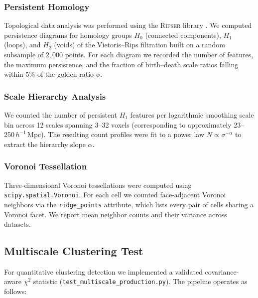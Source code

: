 \documentclass[12pt,a4paper]{article}
\begin{document}
\subsubsection{Persistent Homology}

Topological data analysis was performed using the \textsc{Ripser} library
\citep{bauer2021ripser}.  We computed persistence diagrams for homology groups
$H_0$ (connected components), $H_1$ (loops), and $H_2$ (voids) of the
Vietoris--Rips filtration built on a random subsample of $2{,}000$ points.
For each diagram we recorded the number of features, the maximum persistence,
and the fraction of birth--death scale ratios falling within 5\% of the golden
ratio $\phi$.

\subsubsection{Scale Hierarchy Analysis}

We counted the number of persistent $H_1$ features per logarithmic smoothing
scale bin across 12 scales spanning 3--32 voxels (corresponding to
approximately 23--250\,$h^{-1}$\,Mpc).  The resulting count profiles were fit
to a power law $N \propto \sigma^{-\alpha}$ to extract the hierarchy slope
$\alpha$.

\subsubsection{Voronoi Tessellation}

Three-dimensional Voronoi tessellations were computed using
\texttt{scipy.spatial.Voronoi}.  For each cell we counted face-adjacent
Voronoi neighbors via the \texttt{ridge\_points} attribute, which lists every
pair of cells sharing a Voronoi facet.  We report mean neighbor counts and
their variance across datasets.

\subsection{Multiscale Clustering Test}
\label{sec:pipeline}

For quantitative clustering detection we implemented a validated covariance-aware
$\chi^2$ statistic (\texttt{test\_multiscale\_production.py}).  The pipeline
operates as follows:
\end{document}
